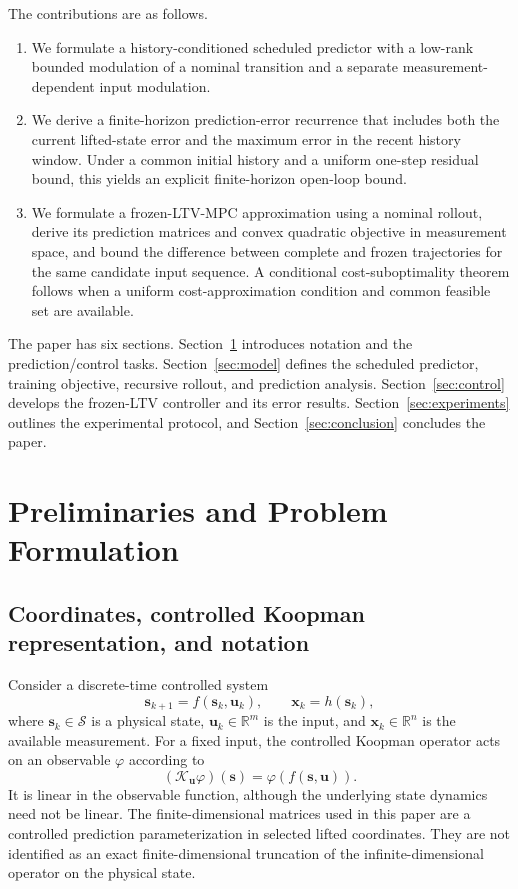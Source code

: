 \documentclass[journal]{IEEEtran}
\newcommand{\vx}{\mathbf{x}}
\newcommand{\vu}{\mathbf{u}}
\newcommand{\vs}{\mathbf{s}}
\newcommand{\R}{\mathbb{R}}
\begin{document}
The contributions are as follows.
\begin{enumerate}
    \item We formulate a history-conditioned scheduled predictor with a low-rank bounded modulation of a nominal transition and a separate measurement-dependent input modulation.
    \item We derive a finite-horizon prediction-error recurrence that includes both the current lifted-state error and the maximum error in the recent history window. Under a common initial history and a uniform one-step residual bound, this yields an explicit finite-horizon open-loop bound.
    \item We formulate a frozen-LTV-MPC approximation using a nominal rollout, derive its prediction matrices and convex quadratic objective in measurement space, and bound the difference between complete and frozen trajectories for the same candidate input sequence. A conditional cost-suboptimality theorem follows when a uniform cost-approximation condition and common feasible set are available.
\end{enumerate}

The paper has six sections. Section~\ref{sec:prelim} introduces notation and the prediction/control tasks. Section~\ref{sec:model} defines the scheduled predictor, training objective, recursive rollout, and prediction analysis. Section~\ref{sec:control} develops the frozen-LTV controller and its error results. Section~\ref{sec:experiments} outlines the experimental protocol, and Section~\ref{sec:conclusion} concludes the paper.

\section{Preliminaries and Problem Formulation}
\label{sec:prelim}

\subsection{Coordinates, controlled Koopman representation, and notation}

Consider a discrete-time controlled system
\begin{equation}
    \vs_{k+1}=f(\vs_k,\vu_k),\qquad \vx_k=h(\vs_k),
    \label{eq:physical_system}
\end{equation}
where $\vs_k\in\mathcal S$ is a physical state, $\vu_k\in\R^m$ is the input, and $\vx_k\in\R^n$ is the available measurement. For a fixed input, the controlled Koopman operator acts on an observable $\varphi$ according to
\begin{equation}
    (\mathcal K_{\vu}\varphi)(\vs)=\varphi(f(\vs,\vu)).
    \label{eq:koopman_operator}
\end{equation}
It is linear in the observable function, although the underlying state dynamics need not be linear. The finite-dimensional matrices used in this paper are a controlled prediction parameterization in selected lifted coordinates. They are not identified as an exact finite-dimensional truncation of the infinite-dimensional operator on the physical state.
\end{document}
